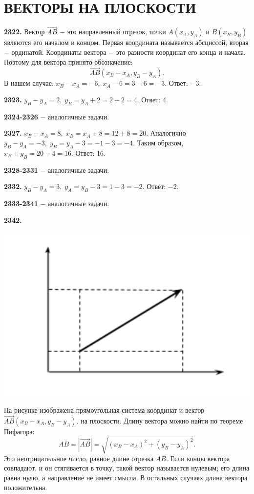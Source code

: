 \section{ВЕКТОРЫ НА ПЛОСКОСТИ}

\textbf{2322.} Вектор $\overrightarrow{AB}$ $-$ это направленный отрезок, точки $A(x_A, y_A)$ и $B(x_B, y_B)$ являются его началом и концом. Первая координата называется абсциссой, вторая $-$ ординатой. Координаты вектора $-$ это разности координат его конца и начала. Поэтому для вектора принято обозначение:
\[
\overrightarrow{AB}(x_B-x_A, y_B-y_A).
\]
В нашем случае: $x_B-x_A=-6, \; x_A-6=3-6=-3.$ \newline \null \hspace*{\fill} Ответ: $-$3.

\textbf{2323.} $y_B-y_A=2, \; y_B=y_A+2=2+2=4.$ \newline \null \hspace*{\fill} Ответ: 4.

\textbf{2324-2326} $-$ аналогичные задачи.

\textbf{2327.} $x_B-x_A=8, \;x_B=x_A+8=12+8=20$. Аналогично $y_B-y_A=-3, \; y_B=y_A-3=-1-3=-4.$ Таким образом, $x_B+y_B=20-4=16.$ \newline \null \hspace*{\fill} Ответ: 16.

\textbf{2328-2331} $-$ аналогичные задачи.

\textbf{2332.} $y_B-y_A=3, \; y_A=y_B-3=1-3=-2.$ \newline \null \hspace*{\fill} Ответ: $-$2.

\textbf{2333-2341} $-$ аналогичные задачи.

\textbf{2342.}

{\centering \includegraphics[width=0.5\linewidth]{Geometry/Content/54.png}
	
}

На рисунке изображена прямоугольная система координат и вектор $\overrightarrow{AB}(x_B-x_A, y_B-y_A)$. на плоскости. Длину вектора  можно найти по теореме Пифагора:
\[
AB=|\overrightarrow{AB}|=\sqrt{(x_B-x_A)^2+(y_B-y_A)^2}.
\]
Это неотрицательное число, равное длине отрезка $AB$. Если концы вектора совпадают,  и он стягивается в точку, такой вектор называется нулевым; его длина равна нулю, а направление не имеет смысла. В остальных случаях длина вектора положительна.

